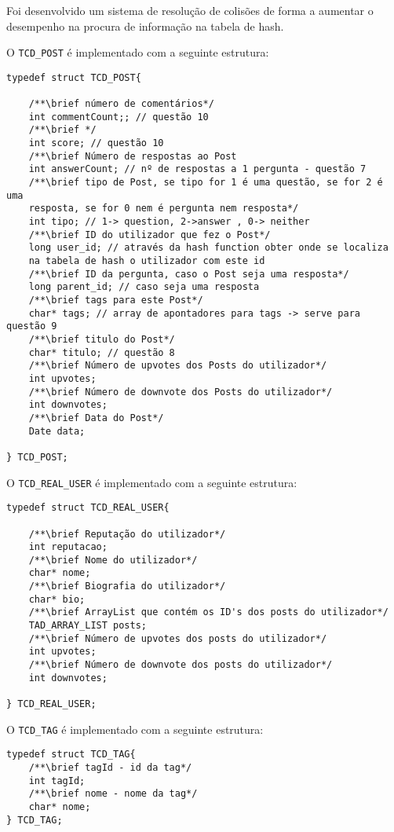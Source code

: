 \documentclass[4apaper]{report}
\begin{document}
Foi desenvolvido um sistema de resolução de colisões de forma a aumentar o desempenho na procura de informação na tabela de hash.

O \texttt{TCD\_POST}  é implementado com a seguinte estrutura:

\begin{verbatim}
typedef struct TCD_POST{

    /**\brief número de comentários*/
    int commentCount;; // questão 10
    /**\brief */
    int score; // questão 10
    /**\brief Número de respostas ao Post    
    int answerCount; // nº de respostas a 1 pergunta - questão 7
    /**\brief tipo de Post, se tipo for 1 é uma questão, se for 2 é uma 
    resposta, se for 0 nem é pergunta nem resposta*/
    int tipo; // 1-> question, 2->answer , 0-> neither
    /**\brief ID do utilizador que fez o Post*/
    long user_id; // através da hash function obter onde se localiza 
    na tabela de hash o utilizador com este id
    /**\brief ID da pergunta, caso o Post seja uma resposta*/
    long parent_id; // caso seja uma resposta  
    /**\brief tags para este Post*/
    char* tags; // array de apontadores para tags -> serve para questão 9
    /**\brief titulo do Post*/
    char* titulo; // questão 8
    /**\brief Número de upvotes dos Posts do utilizador*/
    int upvotes;    
    /**\brief Número de downvote dos Posts do utilizador*/
    int downvotes;
    /**\brief Data do Post*/
    Date data;

} TCD_POST;
\end{verbatim}

O \texttt{TCD\_REAL\_USER}  é implementado com a seguinte estrutura:

\begin{verbatim}
typedef struct TCD_REAL_USER{

    /**\brief Reputação do utilizador*/
    int reputacao;
    /**\brief Nome do utilizador*/
    char* nome;
    /**\brief Biografia do utilizador*/
    char* bio;
    /**\brief ArrayList que contém os ID's dos posts do utilizador*/
    TAD_ARRAY_LIST posts;
    /**\brief Número de upvotes dos posts do utilizador*/
    int upvotes;
    /**\brief Número de downvote dos posts do utilizador*/
    int downvotes;

} TCD_REAL_USER;
\end{verbatim}

\newpage

O \texttt{TCD\_TAG}  é implementado com a seguinte estrutura:

\begin{verbatim}
typedef struct TCD_TAG{
    /**\brief tagId - id da tag*/
    int tagId;
    /**\brief nome - nome da tag*/
    char* nome;
} TCD_TAG;
\end{verbatim}
\end{document}
